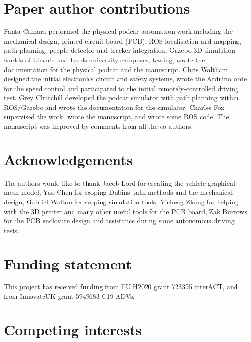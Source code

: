 \documentclass[a4paper]{article}
\begin{document}
	
	\section*{Paper author contributions}\label{h.fy8hbipy6kwe}
	
	Fanta Camara performed the physical podcar automation work including the mechanical design, printed circuit board (PCB), ROS localisation and mapping, path planning, people detector and tracker integration, Gazebo 3D simulation worlds of Lincoln and Leeds university campuses, testing, wrote the documentation for the physical podcar and the manuscript. Chris Waltham designed the initial electronics circuit and safety systems, wrote the Arduino code for the speed control and participated to the initial remotely-controlled driving test. Grey Churchill developed the podcar simulator with path planning within ROS/Gazebo and wrote the documentation for the simulator. Charles Fox supervised the work, wrote the manuscript, and wrote some ROS code. The manuscript was improved by comments from all the co-authors.
	
	
	\section*{Acknowledgements}\label{h.gu3yyarx72d6}
	
	The authors would like to thank Jacob Lord for creating the vehicle graphical mesh model, Yao Chen for scoping Dubins path methods and the mechanical design, Gabriel Walton for scoping simulation tools, Yicheng Zhang for helping with the 3D printer and many other useful tools for the PCB board, Zak Burrows for the PCB enclosure design and assistance during some autonomous driving tests.
	
	
	\section*{Funding statement}\label{h.4u1a7tugh2om}
	
	
	This project has received funding from EU H2020 grant 723395 interACT, and from InnovateUK  grant 5949683 C19-ADVs.
	
	
	\section*{Competing interests}\label{h.q1j1rznb43fl}
	
\end{document}
